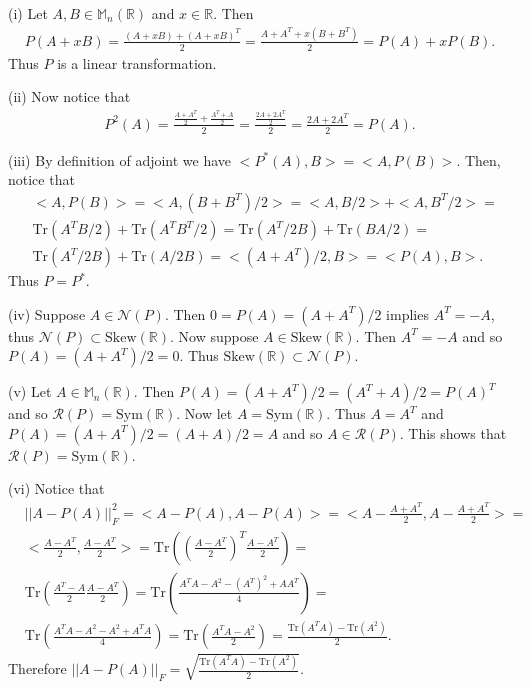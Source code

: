 \documentclass[letterpaper,12pt]{article}
\theoremstyle{definition}
\newenvironment{problem}[2][Problem]{\begin{trivlist}
\item[\hskip \labelsep {\bfseries #1}\hskip \labelsep {\bfseries #2.}]}{\end{trivlist}}
\begin{document}
\begin{problem}{47}
\end{problem} \begin{problem}{48}
(i)
Let $A,B\in\mathbb M_n(\mathbb R)$ and $x\in\mathbb R$.
Then
\begin{align*}
    P(A+xB)=\frac{(A+xB)+(A+xB)^T}{2}=
    \frac{A+A^T+x(B+B^T)}{2}=P(A)+xP(B).
\end{align*}
Thus $P$ is a linear transformation.

(ii)
Now notice that
\begin{align*}
    P^2(A)=\frac{\frac{A+A^T}{2}+\frac{A^T+A}{2}}{2}=
    \frac{\frac{2A+2A^T}{2}}{2}=\frac{2A+2A^T}{2}=P(A).
\end{align*}

(iii)
By definition of adjoint we have $<P^*(A),B>=<A,P(B)>$.
Then, notice that
\begin{align*}
    &<A,P(B)>=<A,(B+B^T)/2>=
    <A,B/2>+<A,B^T/2>=\\
    &\text{Tr}(A^TB/2)+\text{Tr}(A^TB^T/2)=
    \text{Tr}(A^T/2B)+\text{Tr}(BA/2)=\\
    &\text{Tr}(A^T/2B)+\text{Tr}(A/2B)=
    <(A+A^T)/2,B>=<P(A),B>.
\end{align*}
Thus $P=P^*$.

(iv)
Suppose $A\in\mathcal N(P)$.
Then $0=P(A)=(A+A^T)/2$ implies $A^T=-A$, thus $\mathcal N(P)\subset\text{Skew}(\mathbb R)$.
Now suppose $A\in\text{Skew}(\mathbb R)$.
Then $A^T=-A$ and so $P(A)=(A+A^T)/2=0$. Thus $\text{Skew}(\mathbb R)\subset\mathcal N(P)$.

(v)
Let $A\in\mathbb M_n(\mathbb R)$.
Then $P(A)=(A+A^T)/2=(A^T+A)/2=P(A)^T$ and so $\mathcal R(P)=\text{Sym}(\mathbb R)$.
Now let $A=\text{Sym}(\mathbb R)$.
Thus $A=A^T$ and $P(A)=(A+A^T)/2=(A+A)/2=A$ and so $A\in\mathcal R(P)$.
This shows that $\mathcal R(P)=\text{Sym}(\mathbb R)$.

(vi)
Notice that
\begin{align*}
    &||A - P(A)||_F^2 = <A - P(A), A - P(A)> =
    <A - \frac{A + A^T}{2}, A - \frac{A + A^T}{2}> =\\
    &<\frac{A - A^T}{2}, \frac{A - A^T}{2}> =
    \text{Tr}\left(\left(\frac{A - A^T}{2}\right)^T\frac{A - A^T}{2}\right)=\\
    &\text{Tr}\left(\frac{A^T - A}{2}\frac{A - A^T}{2}\right) =
    \text{Tr}\left(\frac{A^TA - A^2 - (A^T)^2 + AA^T}{4}\right) =\\
    &\text{Tr}\left(\frac{A^TA - A^2 - A^2 + A^TA}{4}\right) =
    \text{Tr}\left(\frac{A^TA - A^2}{2}\right) =
    \frac{\text{Tr}(A^TA) - \text{Tr}(A^2)}{2}.
\end{align*}
Therefore $||A - P(A)||_F = \sqrt{\frac{\text{Tr}(A^TA) - \text{Tr}(A^2)}{2}}$.


\end{problem}
\end{document}
